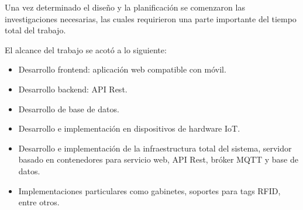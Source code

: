 Una vez determinado el diseño y la planificación se comenzaron las investigaciones necesarias, las cuales requirieron una parte importante del tiempo total del trabajo.

El alcance del trabajo se acotó a lo siguiente:

\begin{itemize}
	\item Desarrollo frontend: aplicación web compatible con móvil.
	\item Desarrollo backend: API Rest.
	\item Desarrollo de base de datos.
	\item Desarrollo e implementación en dispositivos de hardware IoT.
	\item Desarrollo e implementación de la infraestructura total del sistema, servidor basado en contenedores para servicio web, API Rest, bróker MQTT y base de datos. 
	\item Implementaciones particulares como gabinetes, soportes para tags RFID, entre otros.                  
\end{itemize}
%
%
%
%
%
%
%
%
